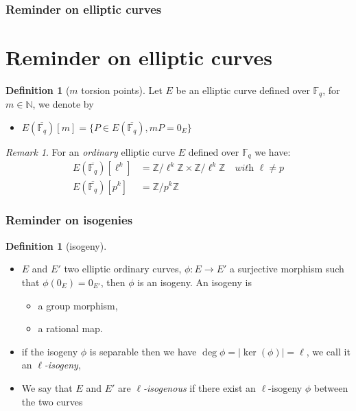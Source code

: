 \documentclass[10pt,a4paper]{beamer}
\theoremstyle{plain}
\theoremstyle{definition}
\theoremstyle{definition}
\theoremstyle{definition}
\theoremstyle{definition}
\newtheorem{defi}[thm]{Definition}
\theoremstyle{remark}
\newtheorem{rem}[thm]{Remark}
\theoremstyle{remark}
\begin{document}
\begin{frame}
\frametitle{Reminder on elliptic curves}
\section{Reminder on elliptic curves}


\begin{defi}[$m$ torsion points]
Let $E$ be an elliptic curve defined over $\mathbb{F}_q$, for $m \in \mathbb{N}$, we denote by
\begin{itemize}
\item $E(\overline{\mathbb{F}_q})[m]= \{ P \in E(\overline{\mathbb{F}_q}) , mP=0_E \} $
\end{itemize} 
\end{defi}

\begin{rem}
For an \emph{ordinary} elliptic curve $E$ defined over $\mathbb{F}_q$ we have:
\begin{align*}
E(\overline{\mathbb{F}_q})[\ell^k]&=\mathbb{Z}/\ell^k\mathbb{Z} \times \mathbb{Z}/\ell^k\mathbb{Z} \quad \textit{with } \ell \neq p \\
E(\overline{\mathbb{F}_q})[p^k]&=\mathbb{Z}/p^k\mathbb{Z}
\end{align*}
\end{rem}

\end{frame}

\begin{frame}
\frametitle{Reminder on isogenies}
\begin{defi}[isogeny]
\begin{itemize}
\item $E$ and $E'$ two elliptic ordinary curves, $\phi: E \rightarrow E'$ a surjective morphism such that $\phi(0_{E})=0_{E'}$, then $\phi$ is an isogeny. An isogeny is
\begin{itemize}
 \item a group morphism,
 \item a rational map.
\end{itemize}
 
\item  if the isogeny $\phi$ is separable then we have $\deg \phi = |\ker(\phi)|=\ell$, we call it an \emph{$\ell$-isogeny},

\item We say that $E$ and $E'$ are \emph{$\ell$-isogenous} if there exist an $\ell$-isogeny $\phi$ between the two curves

\end{itemize}
\end{defi}

\end{frame}
\end{document}

